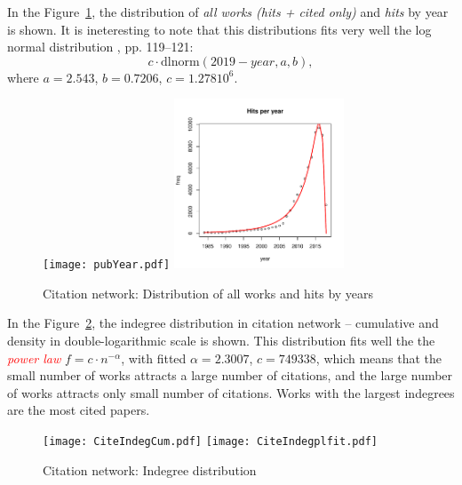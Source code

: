 \documentclass[11pt]{article} %
\newcommand{\keyw}[1]{\textcolor{red}{\emph{#1}}}
\begin{document}
In the Figure~\ref{yeard}, the distribution of \textit{all works (hits + cited only)} and \textit{hits} by year is shown. It is ineteresting to note that this distributions fits very well the log normal distribution \citep{Understand}, pp. 119–121: 
\[ c\cdot \mbox{dlnorm}(2019-year,a,b), \]
 where
$a = 2.543$,
$b = 0.7206$,
$c = 1.278 10^6$.\medskip

\begin{figure}
\centerline{
\texttt{[image: pubYear.pdf]} \qquad
\includegraphics[width=0.45\textwidth]{yearshits7.pdf} }
\caption{Citation network: Distribution of all works and hits by years}\label{yeard}
\end{figure}
\medskip   

In the Figure~\ref{cindeg}, the indegree distribution in citation network -- cumulative and density in double-logarithmic scale  is shown. This distribution fits well the the \keyw{power law} $f = c \cdot n^{-\alpha}$, with fitted $\alpha = 2.3007$, $c=749338$, which means that the small number of works   attracts a large number of citations, and the large number of works attracts only small number of citations. Works with the largest indegrees are the most cited papers. 

\begin{figure}
\centerline{
\texttt{[image: CiteIndegCum.pdf]} \qquad
\texttt{[image: CiteIndegplfit.pdf]} }
\caption{Citation network: Indegree distribution}\label{cindeg}
\end{figure}
\medskip   
\end{document}
